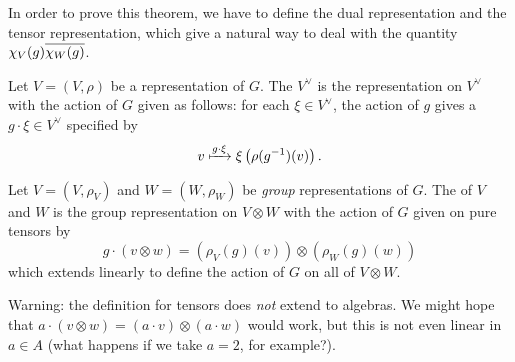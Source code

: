In order to prove this theorem, we have to define
the dual representation and the tensor representation,
which give a natural way to deal with the quantity $\chi_V(g)\overline{\chi_W(g)}$.
\begin{definition}
	Let $V = (V, \rho)$ be a representation of $G$.
	The  $V^\vee$ is the representation on $V^\vee$
	with the action of $G$ given as follows: for each $\xi \in V^\vee$,
	the action of $g$ gives a $g \cdot \xi \in V^\vee$ specified by
	\[ v \xmapsto{g \cdot \xi} \xi\left( \rho(g^{-1})(v) \right). \]
\end{definition}
\begin{definition}
	Let $V = (V, \rho_V)$ and $W = (W, \rho_W)$
	be \emph{group} representations of $G$.
	The  of $V$ and $W$ is the group representation
	on $V \otimes W$ with the action of $G$ given on pure tensors by
	\[
		g \cdot (v \otimes w)
		= 
		(\rho_V(g)(v)) \otimes (\rho_W(g)(w)) \]
	which extends linearly to define the action of $G$ on all of $V \otimes W$.
\end{definition}
\begin{remark}
	Warning: the definition for tensors does \emph{not} extend to algebras.
	We might hope that $a \cdot (v \otimes w) = (a \cdot v) \otimes (a \cdot w)$
	would work, but this is not even linear in $a \in A$
	(what happens if we take $a=2$, for example?).
\end{remark}

